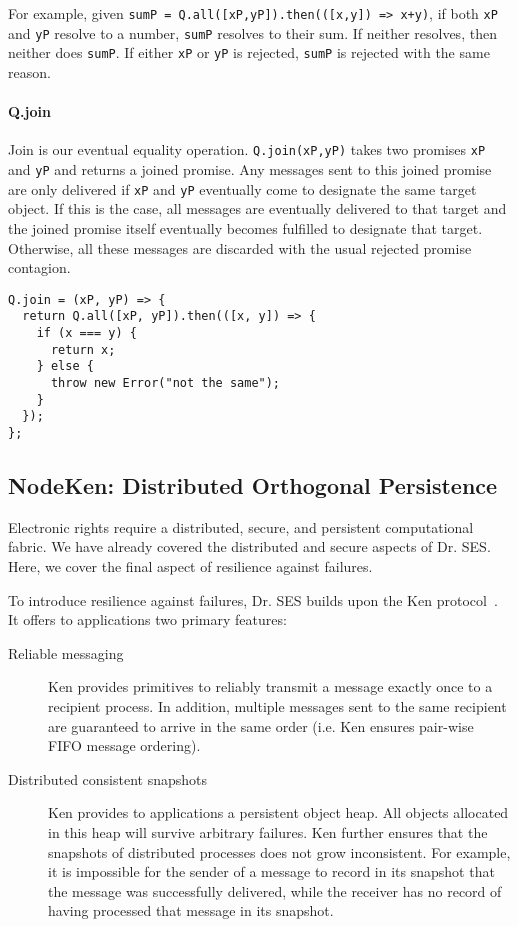 \documentclass{llncs}
\begin{document}
For example, given \texttt{sumP = Q.all([xP,yP]).then(([x,y]) => x+y)}, if both \texttt{xP} and \texttt{yP} resolve to a number, \texttt{sumP} resolves to their sum. If neither resolves, then neither does \texttt{sumP}. If either \texttt{xP} or \texttt{yP} is rejected, \texttt{sumP} is rejected with the same reason.

\paragraph{Q.join} Join is our eventual equality operation. \texttt{Q.join(xP,yP)} takes two promises \texttt{xP} and \texttt{yP} and returns a joined promise. Any messages sent to this joined promise are only delivered if \texttt{xP} and \texttt{yP} eventually come to designate the same target object. If this is the case, all messages are eventually delivered to that target and the joined promise itself eventually becomes fulfilled to designate that target. Otherwise, all these messages are discarded with the usual rejected promise contagion.

\begin{verbatim}
Q.join = (xP, yP) => {
  return Q.all([xP, yP]).then(([x, y]) => {
    if (x === y) {
      return x;
    } else {
      throw new Error("not the same");
    }
  });
};
\end{verbatim}

\subsection{NodeKen: Distributed Orthogonal Persistence}

Electronic rights require a distributed, secure, and persistent computational fabric.
We have already covered the distributed and secure aspects of Dr. SES. Here, we cover the final aspect of resilience against failures.

To introduce resilience against failures, Dr. SES builds upon the Ken protocol~\cite{Yoo:CKen}. It offers to applications two primary features:

\begin{description}
  \item[Reliable messaging] Ken provides primitives to reliably transmit a message exactly once to a recipient process. In addition, multiple messages sent to the same recipient are guaranteed to arrive in the same order (i.e. Ken ensures pair-wise FIFO message ordering).
  \item[Distributed consistent snapshots] Ken provides to applications a persistent object heap. All objects allocated in this heap will survive arbitrary failures. Ken further ensures that the snapshots of distributed processes does not grow inconsistent. For example, it is impossible for the sender of a message to record in its snapshot that the message was successfully delivered, while the receiver has no record of having processed that message in its snapshot.
\end{description}
\end{document}
